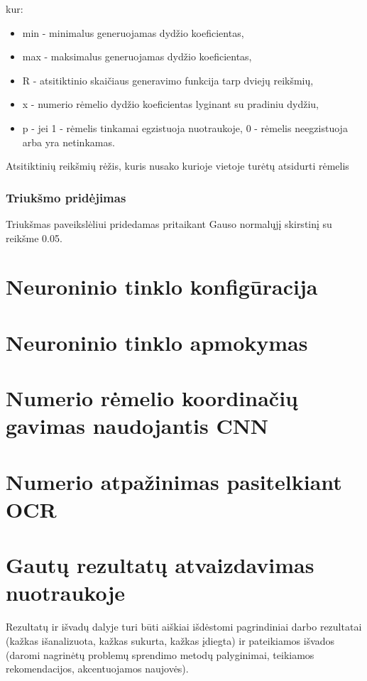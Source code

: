 \documentclass{VUMIFPSkursinis}
\begin{document}
kur:
\begin{itemize}
  \item min - minimalus generuojamas dydžio koeficientas,
  \item max - maksimalus generuojamas dydžio koeficientas,
  \item R - atsitiktinio skaičiaus generavimo funkcija tarp dviejų reikšmių,
  \item x - numerio rėmelio dydžio koeficientas lyginant su pradiniu dydžiu,
  \item p - jei 1 - rėmelis tinkamai egzistuoja nuotraukoje, 0 - rėmelis neegzistuoja arba yra netinkamas.
\end{itemize}



Atsitiktinių reikšmių rėžis, kuris nusako kurioje vietoje turėtų atsidurti rėmelis
\subsubsection{Triukšmo pridėjimas}
Triukšmas paveikslėliui pridedamas pritaikant Gauso normalųjį skirstinį su reikšme 0.05.



\section{Neuroninio tinklo konfigūracija}

\section{Neuroninio tinklo apmokymas}

\section{Numerio rėmelio koordinačių gavimas naudojantis CNN}

\section{Numerio atpažinimas pasitelkiant OCR}

\section{Gautų rezultatų atvaizdavimas nuotraukoje}

Rezultatų ir išvadų dalyje turi būti aiškiai išdėstomi pagrindiniai darbo
rezultatai (kažkas išanalizuota, kažkas sukurta, kažkas įdiegta) ir pateikiamos
išvados (daromi nagrinėtų problemų sprendimo metodų palyginimai, teikiamos
rekomendacijos, akcentuojamos naujovės).
\end{document}
